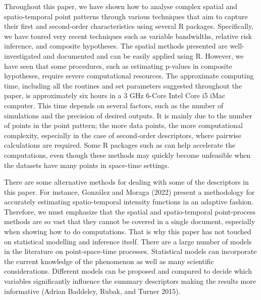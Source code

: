 Throughout this paper, we have shown how to analyse complex spatial and spatio-temporal point patterns through various techniques that aim to capture their first and second-order characteristics using several R packages. Specifically, we have toured very recent techniques such as variable bandwidths, relative risk inference, and composite hypotheses. The spatial methods presented are well-investigated and documented and can be easily applied using R. However, we have seen that some procedures, such as estimating p-values in composite hypotheses, require severe computational resources. The approximate computing time, including all the routines and set parameters suggested throughout the paper, is approximately six hours in a 3 GHz 6-Core Intel Core i5 iMac computer. This time depends on several factors, such as the number of simulations and the precision of desired outputs. It is mainly due to the number of points in the point pattern; the more data points, the more computational complexity, especially in the case of second-order descriptors, where pairwise calculations are required. Some R packages such as  can help accelerate the computations, even though these methods may quickly become unfeasible when the datasets have many points in space-time settings.

There are some alternative methods for dealing with some of the descriptors in this paper. For instance, González and Moraga (2022) present a methodology for accurately estimating spatio-temporal intensity functions in an adaptive fashion. Therefore, we must emphasize that the spatial and spatio-temporal point-process methods are so vast that they cannot be covered in a single document, especially when showing how to do computations. That is why this paper has not touched on statistical modelling and inference itself. There are a large number of models in the literature on point-space-time processes. Statistical models can incorporate the current knowledge of the phenomenon as well as many scientific considerations. Different models can be proposed and compared to decide which variables significantly influence the summary descriptors making the results more informative (Adrian Baddeley, Rubak, and Turner 2015).

